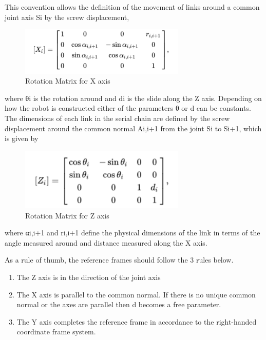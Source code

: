     This convention allows the definition of the movement of links around a common joint axis Si by the screw displacement,
    \begin{figure}[H]
        \centering
        \includegraphics[width=0.7\textwidth]{xframe.PNG}
        \caption{Rotation Matrix for X axis}
        \label{fig:my_label}
    \end{figure}
    where θi is the rotation around and di is the slide along the Z axis. Depending on how the robot is constructed either of the parameters θ or d can be constants. The dimensions of each link in the serial chain are defined by the screw displacement around the common normal Ai,i+1 from the joint Si to Si+1, which is given by
    \begin{figure}[H]
        \centering
        \includegraphics[width=0.7\textwidth]{zframe.PNG}
        \caption{Rotation Matrix for Z axis}
        \label{fig:my_label}
    \end{figure}
    where αi,i+1 and ri,i+1 define the physical dimensions of the link in terms of the angle measured around and distance measured along the X axis. 
    
    As a rule of thumb, the reference frames should follow the 3 rules below.
    \begin{enumerate}
        \item The Z axis is in the direction of the joint axis
        \item The X axis is parallel to the common normal. If there is no unique common normal or the axes are parallel then d becomes a free parameter.
        \item The Y axis completes the reference frame in accordance to the right-handed coordinate frame system.
    \end{enumerate}
    
